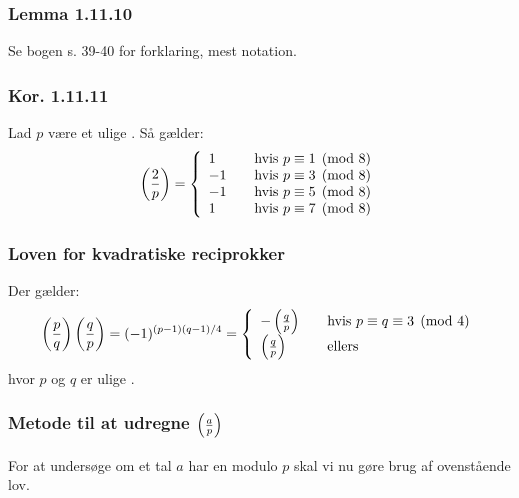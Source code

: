 \subsubsection{Lemma 1.11.10}
Se bogen s. 39-40 for forklaring, mest notation.

\subsubsection{Kor. 1.11.11}
\label{1.11.11}
Lad $p$ være et ulige . Så gælder:
\begin{equation*}
\left(\frac{2}{p}\right) = \left\{
  \begin{array}{l l}
  1 & \quad \text{hvis $p \equiv 1 \pmod{8}$}\\
  -1 & \quad \text{hvis $p \equiv 3 \pmod{8}$}\\
  -1 & \quad \text{hvis $p \equiv 5 \pmod{8}$}\\
  1 & \quad \text{hvis $p \equiv 7 \pmod{8}$}
  \end{array} \right.  
\end{equation*}

\subsubsection{Loven for kvadratiske reciprokker}
\label{1.11.9}
Der gælder:
\begin{equation*}
\left(\frac{p}{q}\right)\left(\frac{q}{p}\right) = (-1)^{(p-1)(q-1)/4} = \left\{
  \begin{array}{l l}
  -\left(\frac{q}{p}\right) & \quad \text{hvis $p \equiv q \equiv 3 \pmod{4}$}\\
  \left(\frac{q}{p}\right) & \quad \text{ellers}\\
  \end{array} \right.  
\end{equation*}
hvor $p$ og $q$ er ulige .

\subsubsection{Metode til at udregne $\left(\frac{a}{p}\right)$}
For at undersøge om et tal $a$ har en  modulo $p$ skal
vi nu gøre brug af ovenstående lov.

